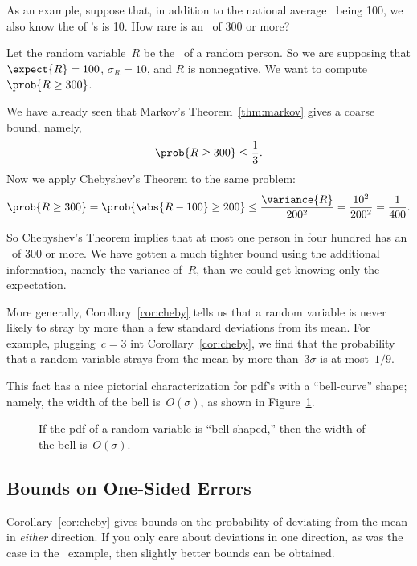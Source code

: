 As an example, suppose that, in addition to the national average
\idx{\IQ}\ being 100, we also know the  of
\IQ's is 10.  How rare is an \IQ\ of 300 or more?

Let the random variable~$R$ be the \IQ\ of a random person.  So we are
supposing that $\expect{R} = 100$, $\sigma_R = 10$, and $R$ is
nonnegative.  We want to compute $\prob{R \geq 300}$.

We have already seen that Markov's Theorem~\ref{thm:markov} gives a
coarse bound, namely,
\[
  \prob{R \geq 300} \leq \frac{1}{3}.
\]
Now we apply Chebyshev's Theorem to the same problem:
\begin{equation}\label{eqn:18I3}
\prob{R \geq 300} = \prob{\abs{R - 100} \geq 200} \leq
    \frac{\variance{R}}{200^2} = \frac{10^2}{200^2} = \frac{1}{400}.
\end{equation}

So Chebyshev's Theorem implies that at most one person in four hundred
has an \IQ\ of 300 or more.  We have gotten a much tighter bound using
the additional information, namely the variance of~$R$, than we could
get knowing only the expectation.

More generally, Corollary~\ref{cor:cheby} tells us that a random
variable is never likely to stray by more than a few standard
deviations from its mean.  For example, plugging~$c = 3$ int
Corollary~\ref{cor:cheby}, we find that the probability that a random
variable strays from the mean by more than~$3 \sigma$ is at
most~$1/9$.

This fact has a nice pictorial characterization for pdf's with a
``bell-curve'' shape; namely, the width of the bell is~$O(\sigma)$, as
shown in Figure~\ref{fig:stdev}.

\begin{figure}


\caption{If the pdf of a random variable is ``bell-shaped,'' then the
  width of the bell is~$O(\sigma)$.}

\label{fig:stdev}

\end{figure}

\subsection{Bounds on One-Sided Errors}

Corollary~\ref{cor:cheby} gives bounds on the probability of deviating
from the mean in \emph{either} direction.  If you only care about
deviations in one direction, as was the case in the \IQ\ example, then
slightly better bounds can be obtained.

